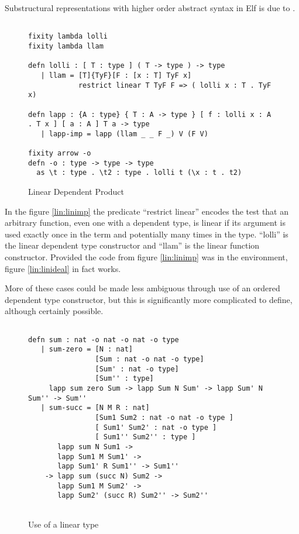 Substructural representations with higher order abstract syntax in Elf is due to \citet{crary2010higher}.

\begin{figure}[H]
\begin{lstlisting}

fixity lambda lolli
fixity lambda llam

defn lolli : [ T : type ] ( T -> type ) -> type
   | llam = [T]{TyF}[F : [x : T] TyF x]
            restrict linear T TyF F => ( lolli x : T . TyF x)

defn lapp : {A : type} { T : A -> type } [ f : lolli x : A . T x ] [ a : A ] T a -> type
   | lapp-imp = lapp (llam _ _ F _) V (F V)

fixity arrow -o
defn -o : type -> type -> type
  as \t : type . \t2 : type . lolli t (\x : t . t2)

\end{lstlisting}
\caption{Linear Dependent Product}
\label{lin:lindep}
\end{figure}


In the figure \ref{lin:linimp} the predicate ``restrict linear'' encodes the test that an arbitrary function, even one with a dependent type, is linear \citep{benton1993term} if its argument is used
exactly once in the term and potentially many times in the type.  
``lolli'' is the linear dependent type constructor and ``llam'' is the linear function constructor.
Provided the code from figure \ref{lin:linimp} was in the environment, figure \ref{lin:linideal} in fact works.


More of these cases could be made less ambiguous through use of an ordered dependent type 
constructor, but this is significantly more complicated to define, although certainly possible.


\begin{figure}[H]
\begin{lstlisting}

defn sum : nat -o nat -o nat -o type
   | sum-zero = [N : nat]
                [Sum : nat -o nat -o type]
                [Sum' : nat -o type]
                [Sum'' : type]
     lapp sum zero Sum -> lapp Sum N Sum' -> lapp Sum' N Sum'' -> Sum''
   | sum-succ = [N M R : nat]
                [Sum1 Sum2 : nat -o nat -o type ]
                [ Sum1' Sum2' : nat -o type ]
                [ Sum1'' Sum2'' : type ]
       lapp sum N Sum1 ->
       lapp Sum1 M Sum1' -> 
       lapp Sum1' R Sum1'' -> Sum1''
    -> lapp sum (succ N) Sum2 -> 
       lapp Sum1 M Sum2' ->
       lapp Sum2' (succ R) Sum2'' -> Sum2''
   
\end{lstlisting}
\caption{Use of a linear type}
\label{lin:use}
\end{figure}


